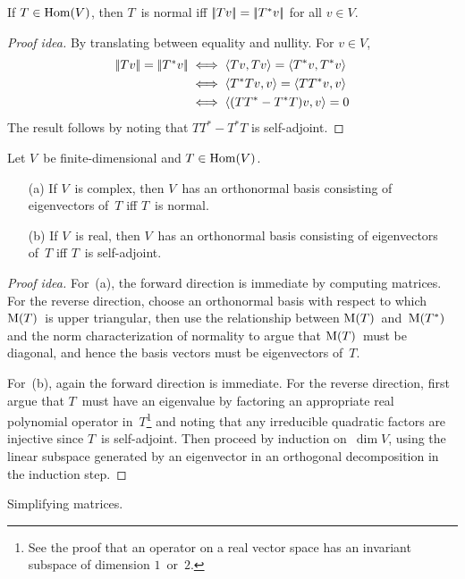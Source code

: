 \begin{thm}
If \(T\in\operatorname{Hom}(V)\), then \(T\)~is normal iff \(\left|\!\left|{Tv}\right|\!\right|=\left|\!\left|{T^*v}\right|\!\right|\) for all \(v\in V\).
\end{thm}
\begin{proof}[Proof idea]
By translating between equality and nullity. For \(v\in V\),
\begin{align*}
\left|\!\left|{Tv}\right|\!\right|=\left|\!\left|{\textstyle T^*v}\right|\!\right|&\iff\langle{Tv},{Tv}\rangle=\langle{T^*v},{T^*v}\rangle\\
	&\iff\langle{T^*Tv},{v}\rangle=\langle{TT^*v},{v}\rangle\\
	&\iff\langle{(TT^*-T^*T)v},{v}\rangle=0
\end{align*}
The result follows by noting that \(TT^*-T^*T\) is self-adjoint.
\end{proof}

\begin{thm}
Let \(V\)~be finite-dimensional and \(T\in\operatorname{Hom}(V)\).
\begin{enumerate}[itemsep=0pt]
\item[(a)] If \(V\)~is complex, then \(V\)~has an orthonormal basis consisting of eigenvectors of~\(T\) iff \(T\)~is normal.
\item[(b)] If \(V\)~is real, then \(V\)~has an orthonormal basis consisting of eigenvectors of~\(T\) iff \(T\)~is self-adjoint.
\end{enumerate}
\end{thm}
\begin{proof}[Proof idea]
For~(a), the forward direction is immediate by computing matrices. For the reverse direction, choose an orthonormal basis with respect to which \(\operatorname{M}(T)\)~is upper triangular, then use the relationship between \(\operatorname{M}(T)\)~and~\(\operatorname{M}(T^*)\) and the norm characterization of normality to argue that \(\operatorname{M}(T)\)~must be diagonal, and hence the basis vectors must be eigenvectors of~\(T\).

For~(b), again the forward direction is immediate. For the reverse direction, first argue that \(T\)~must have an eigenvalue by factoring an appropriate real polynomial operator in~\(T\)\footnote{See the proof that an operator on a real vector space has an invariant subspace of dimension \(1\)~or~\(2\).} and noting that any irreducible quadratic factors are injective since \(T\)~is self-adjoint. Then proceed by induction on~\(\dim V\), using the linear subspace generated by an eigenvector in an orthogonal decomposition in the induction step.
\end{proof}
\begin{app}
Simplifying matrices.
\end{app}

